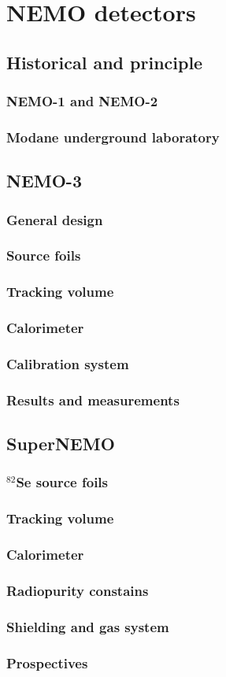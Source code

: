 \documentclass[main.tex]{subfiles}
\begin{document}
\chapter{NEMO detectors}

\section{Historical and principle}
\subsection{NEMO-1 and NEMO-2}
\subsection{Modane underground laboratory}

\section{NEMO-3}
\subsection{General design}
\subsection{Source foils}
\subsection{Tracking volume}
\subsection{Calorimeter}
\subsection{Calibration system}
\subsection{Results and measurements}

\section{SuperNEMO}
\subsection{$^{\text{82}}$Se source foils}
\subsection{Tracking volume}
\subsection{Calorimeter}
\subsection{Radiopurity constains}
\subsection{Shielding and gas system}
\subsection{Prospectives}
\end{document}
